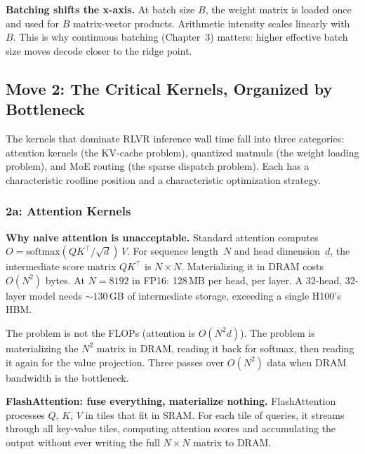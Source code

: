 \textbf{Batching shifts the x-axis.} At batch size $B$, the weight matrix is loaded once and used for $B$ matrix-vector products. Arithmetic intensity scales linearly with $B$. This is why continuous batching (Chapter~3) matters: higher effective batch size moves decode closer to the ridge point.

\subsection*{Move 2: The Critical Kernels, Organized by Bottleneck}

The kernels that dominate RLVR inference wall time fall into three categories: attention kernels (the KV-cache problem), quantized matmuls (the weight loading problem), and MoE routing (the sparse dispatch problem). Each has a characteristic roofline position and a characteristic optimization strategy.

\subsubsection*{2a: Attention Kernels}

\textbf{Why naive attention is unacceptable.} Standard attention computes $O = \text{softmax}(QK^\top\!/\!\sqrt{d})\,V$. For sequence length~$N$ and head dimension~$d$, the intermediate score matrix $QK^\top$ is $N \times N$. Materializing it in DRAM costs $O(N^2)$ bytes. At $N{=}8192$ in FP16: 128\,MB per head, per layer. A 32-head, 32-layer model needs ${\sim}130$\,GB of intermediate storage, exceeding a single H100's HBM.

The problem is not the FLOPs (attention is $O(N^2 d)$). The problem is materializing the $N^2$ matrix in DRAM, reading it back for softmax, then reading it again for the value projection. Three passes over $O(N^2)$ data when DRAM bandwidth is the bottleneck.

\textbf{FlashAttention: fuse everything, materialize nothing.} FlashAttention processes $Q$, $K$, $V$ in tiles that fit in SRAM. For each tile of queries, it streams through all key-value tiles, computing attention scores and accumulating the output without ever writing the full $N \times N$ matrix to DRAM.

